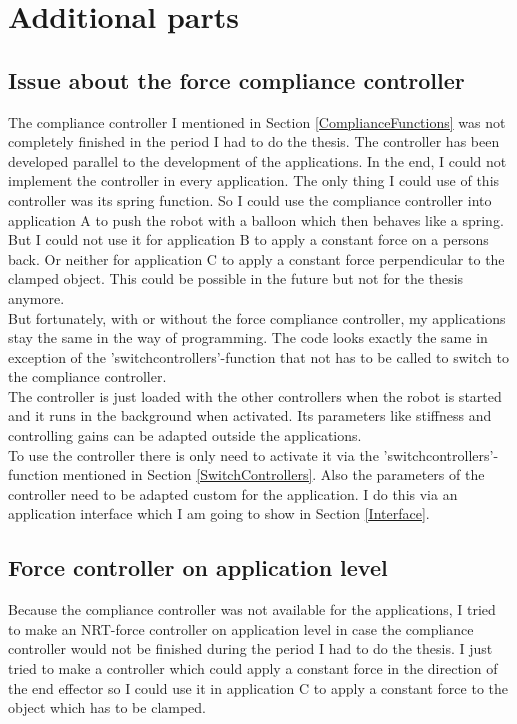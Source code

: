\documentclass[11pt,a4paper]{report}
\begin{document}
\chapter{Additional parts}
\section{Issue about the force compliance controller}
The compliance controller I mentioned in Section \ref{ComplianceFunctions} was not completely finished in the period I had to do the thesis. The controller has been developed parallel to the development of the applications. In the end, I could not implement the controller in every application. The only thing I could use of this controller was its spring function. So I could use the compliance controller into application A to push the robot with a balloon which then behaves like a spring. But I could not use it for application B to apply a constant force on a persons back. Or neither for application C to apply a constant force perpendicular to the clamped object. This could be possible in the future but not for the thesis anymore.\\
But fortunately, with or without the force compliance controller, my applications stay the same in the way of programming. The code looks exactly the same in exception of the 'switch\textunderscore controllers'-function that not has to be called to switch to the compliance controller.\\
The controller is just loaded with the other controllers when the robot is started and it runs in the background when activated. Its parameters like stiffness and controlling gains can be adapted outside the applications.\\
To use the controller there is only need to activate it via the 'switch\textunderscore controllers'-function mentioned in Section \ref{SwitchControllers}. Also the parameters of the controller need to be adapted custom for the application. I do this via an application interface which I am going to show in Section \ref{Interface}.
\newpage

\section{Force controller on application level}
Because the compliance controller was not available for the applications, I tried to make an NRT-force controller on application level in case the compliance controller would not be finished during the period I had to do the thesis. I just tried to make a controller which could apply a constant force in the direction of the end effector so I could use it in application C to apply a constant force to the object which has to be clamped.
\end{document}
